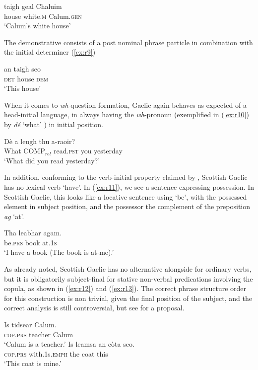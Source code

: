 \documentclass[output=paper,colorlinks,citecolor=brown]{langscibook}
\begin{document}
\ea\label{ex:r8}
\gll taigh  geal  Chaluim \\
house  white.\textsc{m}  Calum.\textsc{gen} \\
\glt `Calum's white house'
\z

The demonstrative consists of a post nominal phrase particle in combination with the initial determiner (\ref{ex:r9})

\ea\label{ex:r9}
\gll an taigh seo \\
\textsc{det} house \textsc{dem} \\
\glt `This house' 
\z

When it comes to \textit{wh}-question formation, Gaelic again behaves as expected of a head-initial language, in always having the \textit{wh}-pronoun (exemplified in (\ref{ex:r10}) by \textit{d\'e} `what' ) in initial position. 


\ea\label{ex:r10}
\gll D\`{e}  a leugh  thu  a-raoir? \\
What  \textsc{COMP$_{rel}$} read.\textsc{pst}  you  yesterday \\
\glt `What did you read yesterday?'
\z

In addition, conforming to the verb-initial property claimed by \citet{freezegeorgopolous00}, Scottish Gaelic has no lexical verb `have'. In (\ref{ex:r11}), we see a sentence expressing possession. In Scottish Gaelic, this looks like a locative sentence using `be', with the possessed element in subject position, and the possessor the complement of the preposition \textit{ag} `at'.

\ea\label{ex:r11}
\gll Tha  leabhar  agam. \\
be.\textsc{prs}  book  at.\textsc{1s} \\
\glt `I have a book (The book is at-me).'
\z

As already noted,  Scottish Gaelic has no  alternative alongside  for ordinary verbs,  but it is obligatorily subject-final for stative non-verbal predications involving the copula, as shown in (\ref{ex:r12}) and (\ref{ex:r13}). The correct phrase structure order for this construction  is non trivial, given the final position of the subject, and the correct analysis is still controversial, but see \citet{adgerramchand03} for a proposal. 

\ea\label{ex:r12}
\gll Is  tidsear  Calum. \\
\textsc{cop.}\textsc{prs}  teacher  Calum \\
\glt `Calum is a teacher.'
\ex\label{ex:r13}
\gll Is  leamsa  an c\`{o}ta seo. \\
\textsc{cop.}\textsc{prs}  with.1s.\textsc{emph}  the coat this \\
\glt `This coat is mine.'
\z
\end{document}
